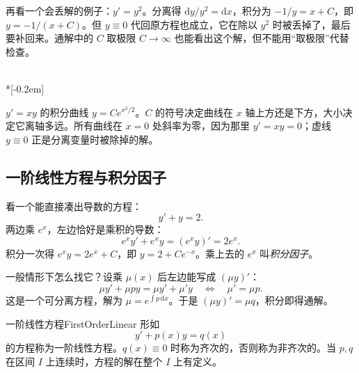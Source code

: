 再看一个会丢解的例子：$y'=y^2$。分离得 $\mathrm{d}y/y^2=\mathrm{d}x$，积分为 $-1/y=x+C$，即 $y=-1/(x+C)$。但 $y\equiv0$ 代回原方程也成立，它在除以 $y^2$ 时被丢掉了，最后要补回来。通解中的 $C$ 取极限 $C\to\infty$ 也能看出这个解，但不能用“取极限”代替检查。

\begin{center}
\\*[-0.2em]
\parbox{0.86\linewidth}{\centering\footnotesize
$y'=xy$ 的积分曲线 $y=Ce^{x^2/2}$。$C$ 的符号决定曲线在 $x$ 轴上方还是下方，大小决定它离轴多远。所有曲线在 $x=0$ 处斜率为零，因为那里 $y'=xy=0$；虚线 $y\equiv0$ 正是分离变量时被除掉的解。}
\end{center}

\subsection{一阶线性方程与积分因子}

看一个能直接凑出导数的方程：
\[
  y'+y=2.
\]
两边乘 $e^x$，左边恰好是乘积的导数：
\[
  e^xy'+e^xy=(e^xy)'=2e^x.
\]
积分一次得 $e^xy=2e^x+C$，即 $y=2+Ce^{-x}$。乘上去的 $e^x$ 叫\emph{积分因子}。

一般情形下怎么找它？设乘 $\mu(x)$ 后左边能写成 $(\mu y)'$：
\[
  \mu y'+\mu p y=\mu y'+\mu'y
  \quad\Longleftrightarrow\quad
  \mu'=\mu p.
\]
这是一个可分离方程，解为 $\mu=e^{\int p\,\mathrm{d}x}$。于是 $(\mu y)'=\mu q$，积分即得通解。

\begin{mydef}{一阶线性方程}{FirstOrderLinear}
形如
\[
  y'+p(x)y=q(x)
\]
的方程称为一阶线性方程。$q(x)\equiv0$ 时称为齐次的，否则称为非齐次的。当 $p,q$ 在区间 $I$ 上连续时，方程的解在整个 $I$ 上有定义。
\end{mydef}

